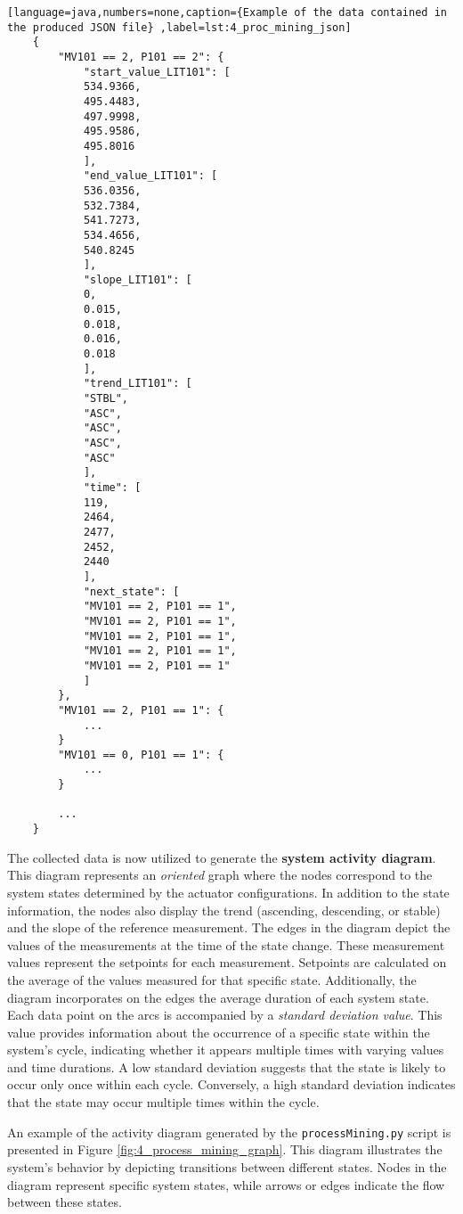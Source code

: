 \begin{lstlisting}[language=java,numbers=none,caption={Example of the data contained in the produced JSON file} ,label=lst:4_proc_mining_json]
	{
		"MV101 == 2, P101 == 2": {
			"start_value_LIT101": [
			534.9366,
			495.4483,
			497.9998,
			495.9586,
			495.8016
			],
			"end_value_LIT101": [
			536.0356,
			532.7384,
			541.7273,
			534.4656,
			540.8245
			],
			"slope_LIT101": [
			0,
			0.015,
			0.018,
			0.016,
			0.018
			],
			"trend_LIT101": [
			"STBL",
			"ASC",
			"ASC",
			"ASC",
			"ASC"
			],
			"time": [
			119,
			2464,
			2477,
			2452,
			2440
			],
			"next_state": [
			"MV101 == 2, P101 == 1",
			"MV101 == 2, P101 == 1",
			"MV101 == 2, P101 == 1",
			"MV101 == 2, P101 == 1",
			"MV101 == 2, P101 == 1"
			]
		},
		"MV101 == 2, P101 == 1": {
			...
		}
		"MV101 == 0, P101 == 1": {
			...
		}
		
		...
	}
\end{lstlisting}

The collected data is now utilized to generate the \textbf{system activity diagram}. This diagram represents an \textit{oriented} graph where the nodes correspond to the system states determined by the actuator configurations. In addition to the state information, the nodes also display the trend (ascending, descending, or stable) and the slope of the reference measurement.\newline
The edges in the diagram depict the values of the measurements at the time of the state change. These measurement values represent the setpoints for each measurement. Setpoints are calculated on the average of the values measured for that specific state. Additionally, the diagram incorporates on the edges the average duration of each system state.\newline
Each data point on the arcs is accompanied by a \textit{standard deviation value}. This value provides information about the occurrence of a specific state within the system's cycle, indicating whether it appears multiple times with varying values and time durations. A low standard deviation suggests that the state is likely to occur only once within each cycle. Conversely, a high standard deviation indicates that the state may occur multiple times within the cycle.

\bigskip
An example of the activity diagram generated by the \texttt{processMining.py} script is presented in Figure \ref{fig:4_process_mining_graph}. This diagram illustrates the system's behavior by depicting transitions between different states. Nodes in the diagram represent specific system states, while arrows or edges indicate the flow between these states.

